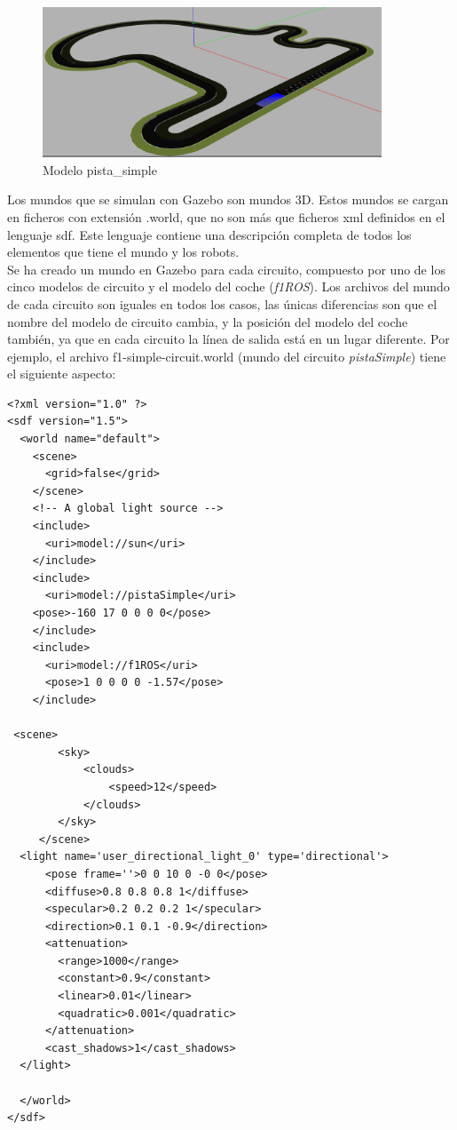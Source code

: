 \begin{figure}[H]
  \begin{center}
    \includegraphics[width=0.9\textwidth]{figures/Infraestructura/circuit_Small.png}
		\caption{Modelo pista\_simple}
		\label{fig.small}
		\end{center}
\end{figure}


Los mundos que se simulan con Gazebo son mundos 3D. Estos mundos se cargan en ficheros con extensión .world, que no son más que ficheros \acrshort{xml} definidos en el lenguaje \acrshort{sdf}. Este lenguaje contiene una descripción completa de todos los elementos que tiene el mundo y los robots.\\

Se ha creado un mundo en Gazebo para cada circuito, compuesto por uno de los cinco modelos de circuito y el modelo del coche (\textit{f1ROS}). Los archivos del mundo de cada circuito son iguales en todos los casos, las únicas diferencias son que el nombre del modelo de circuito cambia, y la posición del modelo del coche también, ya que en cada circuito la línea de salida está en un lugar diferente. Por ejemplo, el archivo f1-simple-circuit.world (mundo del circuito \textit{pistaSimple}) tiene el
siguiente aspecto:

\vspace{20pt}
\begin{lstlisting}[frame=single]
<?xml version="1.0" ?>
<sdf version="1.5">
  <world name="default">
    <scene>
      <grid>false</grid>
    </scene>
    <!-- A global light source -->
    <include>
      <uri>model://sun</uri>
    </include>
    <include>
      <uri>model://pistaSimple</uri>
	<pose>-160 17 0 0 0 0</pose>
    </include>
    <include>
      <uri>model://f1ROS</uri>
      <pose>1 0 0 0 0 -1.57</pose>
    </include>

 <scene>
        <sky>
            <clouds>
                <speed>12</speed>
            </clouds>
        </sky>
     </scene>
  <light name='user_directional_light_0' type='directional'>
      <pose frame=''>0 0 10 0 -0 0</pose>
      <diffuse>0.8 0.8 0.8 1</diffuse>
      <specular>0.2 0.2 0.2 1</specular>
      <direction>0.1 0.1 -0.9</direction>
      <attenuation>
        <range>1000</range>
        <constant>0.9</constant>
        <linear>0.01</linear>
        <quadratic>0.001</quadratic>
      </attenuation>
      <cast_shadows>1</cast_shadows>
  </light>

  </world>
</sdf>

\end{lstlisting}

